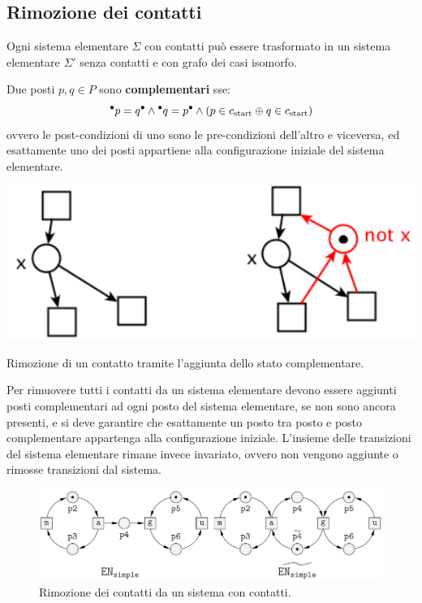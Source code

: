 \subsection*{Rimozione dei contatti}
Ogni sistema elementare $\Sigma$ con contatti può essere trasformato in un
sistema elementare $\Sigma'$ senza contatti e con grafo dei casi isomorfo.
\begin{defn}
    Due posti $p, q \in P$ sono \textbf{complementari} sse:
    \[
        {^\bullet}p = q^\bullet \land {^\bullet}q = p^\bullet
        \land \left(p \in c_{\textnormal{start}} \oplus q \in c_{\textnormal{start}}\right)
    \]
    ovvero le post-condizioni di uno sono le pre-condizioni dell'altro
    e viceversa, ed esattamente uno dei posti appartiene alla configurazione
    iniziale del sistema elementare.
\end{defn}

\begin{marginfigure}
    \includegraphics[width=0.85\linewidth]{img/contatto_complementare.png}
    \caption{Rimozione di un contatto tramite l'aggiunta dello stato complementare.}
    \label{fig:sistema_con_contatti}
\end{marginfigure}

Per rimuovere tutti i contatti da un sistema elementare devono essere
aggiunti posti complementari ad ogni posto del sistema elementare,
se non sono ancora presenti, e si deve garantire che esattamente
un posto tra posto e posto complementare appartenga alla configurazione
iniziale.
L'insieme delle transizioni del sistema elementare rimane invece invariato,
ovvero non vengono aggiunte o rimosse transizioni dal sistema.

\begin{figure}
    \centering
    \includegraphics[width=\linewidth]{img/sistema_senza_contatti.png}
    \caption{Rimozione dei contatti da un sistema con contatti.}
    \label{fig:sistema_senza_contatti}
\end{figure}

